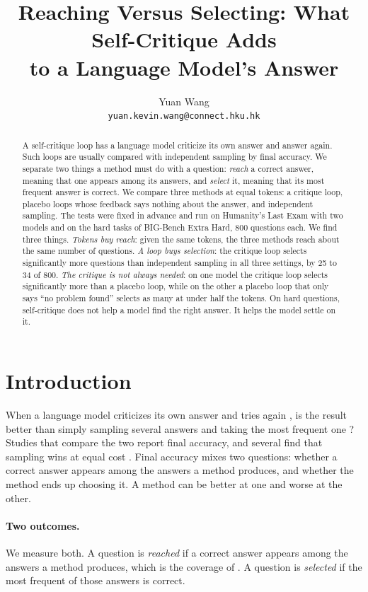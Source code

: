 \documentclass[11pt]{article}
\title{Reaching Versus Selecting: What Self-Critique Adds\\to a Language Model's Answer}
\author{Yuan Wang \\
  \texttt{yuan.kevin.wang@connect.hku.hk}}
\begin{document}
\maketitle

\begin{abstract}
A self-critique loop has a language model criticize its own answer and answer again.
Such loops are usually compared with independent sampling by final accuracy.
We separate two things a method must do with a question: \emph{reach} a correct answer, meaning that one appears among its answers, and \emph{select} it, meaning that its most frequent answer is correct.
We compare three methods at equal tokens: a critique loop, placebo loops whose feedback says nothing about the answer, and independent sampling.
The tests were fixed in advance and run on Humanity's Last Exam with two models and on the hard tasks of BIG-Bench Extra Hard, 800 questions each.
We find three things.
\emph{Tokens buy reach}: given the same tokens, the three methods reach about the same number of questions.
\emph{A loop buys selection}: the critique loop selects significantly more questions than independent sampling in all three settings, by 25 to 34 of 800.
\emph{The critique is not always needed}: on one model the critique loop selects significantly more than a placebo loop, while on the other a placebo loop that only says ``no problem found'' selects as many at under half the tokens.
On hard questions, self-critique does not help a model find the right answer. It helps the model settle on it.
\end{abstract}

\section{Introduction}

When a language model criticizes its own answer and tries again \citep{madaan2023selfrefine,shinn2023reflexion}, is the result better than simply sampling several answers and taking the most frequent one \citep{wang2023selfconsistency}?
Studies that compare the two report final accuracy, and several find that sampling wins at equal cost \citep{wang2025rethinking,mirzaei2026sample}.
Final accuracy mixes two questions: whether a correct answer appears among the answers a method produces, and whether the method ends up choosing it.
A method can be better at one and worse at the other.

\paragraph{Two outcomes.}
We measure both.
A question is \emph{reached} if a correct answer appears among the answers a method produces, which is the coverage of \citet{brown2024monkeys}.
A question is \emph{selected} if the most frequent of those answers is correct.
\end{document}
